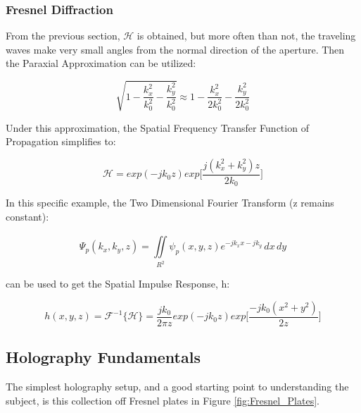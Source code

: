 \documentclass[12pt]{article}
\begin{document}
\subsubsection{Fresnel Diffraction}

From the previous section, \(\mathscr{H}\) is obtained, but more often than not, the traveling waves make very small angles from the normal direction of the aperture. Then the Paraxial Approximation can be utilized:

\begin{equation}
	\sqrt{1 - \frac{k_{x}^2}{k_{0}^2} - \frac{k_{y}^2}{k_0^2}} \approx 1 - \frac{k_{x}^2}{2k_{0}^2} - \frac{k_{y}^2}{2k_{0}^2}
\end{equation}

Under this approximation, the Spatial Frequency Transfer Function of Propagation simplifies to:

\begin{equation}
	\mathscr{H} = exp(-jk_{0}z)exp\bigg[\frac{j(k_{x}^2 + k_{y}^2)z}{2k_{0}}\bigg]
\end{equation}

In this specific example, the Two Dimensional Fourier Transform (z remains constant):

\begin{equation}
	\Psi_{p}(k_{x},k_{y},z) = \iint \limits_{R^2}^{} \psi_{p}(x,y,z)e^{-jk_{x}x - jk_{y}} \,dx\,dy
\end{equation}

can be used to get the Spatial Impulse Response, h:

\begin{equation}
	h(x,y,z) = \mathscr{F}^{-1}\{\mathscr{H}\} = \frac{jk_{0}}{2\pi z} exp(-jk_{0}z)exp\bigg[\frac{-jk_{0}(x^2 + y^2)}{2z}\bigg]
\end{equation}

\subsection{Holography Fundamentals}

The simplest holography setup, and a good starting point to understanding the subject, is this collection off Fresnel plates in Figure \ref{fig:Fresnel_Plates}.
\end{document}
